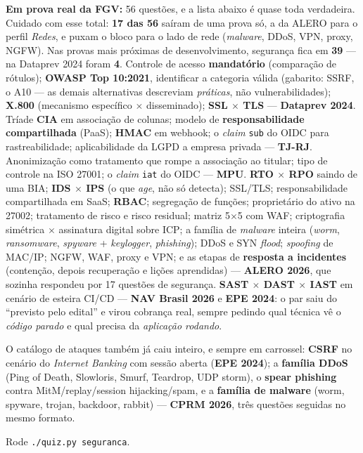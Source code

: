 \begin{jacaiu}
\textbf{Em prova real da FGV:} 56 questões, e a lista abaixo é quase toda
verdadeira. Cuidado com esse total: \textbf{17 das 56} saíram de uma prova só,
a da ALERO para o perfil \emph{Redes}, e puxam o bloco para o lado de rede
(\emph{malware}, DDoS, VPN, proxy, NGFW). Nas provas mais próximas de
desenvolvimento, segurança fica em \textbf{39} --- na Dataprev 2024 foram
\textbf{4}. Controle de acesso
\textbf{mandatório} (comparação de rótulos); \textbf{OWASP Top 10:2021},
identificar a categoria válida (gabarito: SSRF, o A10 --- as demais
alternativas descreviam \emph{práticas}, não vulnerabilidades); \textbf{X.800}
(mecanismo específico $\times$ disseminado); \textbf{SSL $\times$ TLS} ---
\textbf{Dataprev 2024}. Tríade \textbf{CIA} em associação de colunas; modelo
de \textbf{responsabilidade compartilhada} (PaaS); \textbf{HMAC} em webhook; o
\emph{claim} \texttt{sub} do OIDC para rastreabilidade; aplicabilidade da LGPD
a empresa privada --- \textbf{TJ-RJ}. Anonimização como tratamento que rompe a
associação ao titular; tipo de controle na ISO 27001; o \emph{claim}
\texttt{iat} do OIDC --- \textbf{MPU}. \textbf{RTO $\times$ RPO} saindo de uma
BIA; \textbf{IDS $\times$ IPS} (o que \emph{age}, não só detecta); SSL/TLS;
responsabilidade compartilhada em SaaS; \textbf{RBAC}; segregação de funções;
proprietário do ativo na 27002; tratamento de risco e risco residual; matriz
5$\times$5 com WAF; criptografia simétrica $\times$ assinatura digital sobre
ICP; a família de \emph{malware} inteira (\emph{worm}, \emph{ransomware},
\emph{spyware} + \emph{keylogger}, \emph{phishing}); DDoS e SYN
\emph{flood}; \emph{spoofing} de MAC/IP; NGFW, WAF, proxy e VPN; e as etapas
de \textbf{resposta a incidentes} (contenção, depois recuperação e lições
aprendidas) --- \textbf{ALERO 2026}, que sozinha respondeu por 17 questões de
segurança. \textbf{SAST $\times$ DAST $\times$ IAST} em cenário de esteira
CI/CD --- \textbf{NAV Brasil 2026} e \textbf{EPE 2024}: o par saiu do
``previsto pelo edital'' e virou cobrança real, sempre pedindo qual técnica vê
o \emph{código parado} e qual precisa da \emph{aplicação rodando}.

O catálogo de ataques também já caiu inteiro, e sempre em carrossel:
\textbf{CSRF} no cenário do \emph{Internet Banking} com sessão aberta
(\textbf{EPE 2024}); a \textbf{família DDoS} (Ping of Death, Slowloris, Smurf,
Teardrop, UDP storm), o \textbf{spear phishing} contra MitM/replay/session
hijacking/spam, e a \textbf{família de malware} (worm, spyware, trojan,
backdoor, rabbit) --- \textbf{CPRM 2026}, três questões seguidas no mesmo
formato.

Rode \texttt{./quiz.py seguranca}.
\end{jacaiu}

